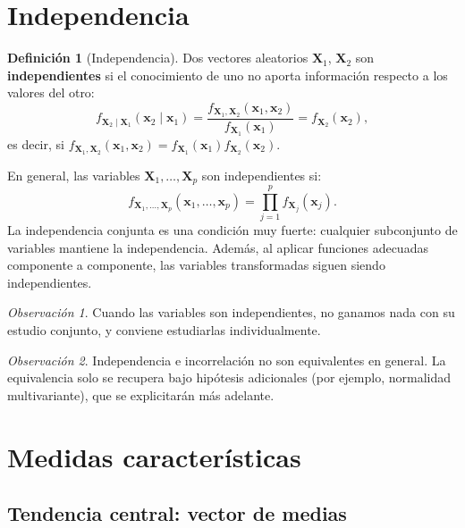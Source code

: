 \documentclass[12pt, a4paper]{article}
\theoremstyle{plain}
\theoremstyle{definition}
\newtheorem{definicion}[teorema]{Definición}
\theoremstyle{remark}
\newtheorem*{observacion}{Observación}
\begin{document}
\section{Independencia}

\begin{definicion}[Independencia]
Dos vectores aleatorios $\mathbf{X}_1$, $\mathbf{X}_2$ son
\textbf{independientes} si el conocimiento de uno no aporta información
respecto a los valores del otro:
\[
  f_{\mathbf{X}_2\mid\mathbf{X}_1}(\mathbf{x}_2\mid\mathbf{x}_1)
  = \frac{f_{\mathbf{X}_1,\mathbf{X}_2}(\mathbf{x}_1,\mathbf{x}_2)}
         {f_{\mathbf{X}_1}(\mathbf{x}_1)}
  = f_{\mathbf{X}_2}(\mathbf{x}_2),
\]
es decir, si
$f_{\mathbf{X}_1,\mathbf{X}_2}(\mathbf{x}_1,\mathbf{x}_2)
=f_{\mathbf{X}_1}(\mathbf{x}_1)f_{\mathbf{X}_2}(\mathbf{x}_2)$.
\end{definicion}

En general, las variables $\mathbf{X}_1, \dots, \mathbf{X}_p$ son
independientes si:
\[
  f_{\mathbf{X}_1,\dots,\mathbf{X}_p}(\mathbf{x}_1, \dots, \mathbf{x}_p)
  = \prod_{j=1}^p f_{\mathbf{X}_j}(\mathbf{x}_j).
\]
La independencia conjunta es una condición muy fuerte: cualquier subconjunto
de variables mantiene la independencia. Además, al aplicar funciones adecuadas
componente a componente, las variables transformadas siguen siendo independientes.

\begin{observacion}
Cuando las variables son independientes, no ganamos nada con su estudio
conjunto, y conviene estudiarlas individualmente.
\end{observacion}

\begin{observacion}
Independencia e incorrelación no son equivalentes en general. La equivalencia
solo se recupera bajo hipótesis adicionales (por ejemplo, normalidad
multivariante), que se explicitarán más adelante.
\end{observacion}

\section{Medidas características}

\subsection{Tendencia central: vector de medias}
\end{document}
